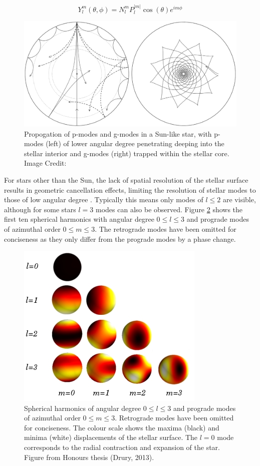 \begin{equation}
    Y^m_l (\theta,\phi) =N^m_lP^{|m|}_l\cos(\theta)e^{im\phi}
    \label{eqtn:spherical_harmonics}
\end{equation}

\begin{figure}
    \centering
    \includegraphics[width=\linewidth]{Chapter1/modes.eps}
    \caption[Propagation of p-modes and g-modes in a solar-like star]{Propogation of p-modes and g-modes in a Sun-like star, with p-modes (left) of lower angular degree penetrating deeping into the stellar interior and g-modes (right) trapped within the stellar core. Image Credit: \cite{aerts_asteroseismology_2010}}
    \label{fig:modes}
\end{figure}

For stars other than the Sun, the lack of spatial resolution of the stellar surface results in geometric cancellation effects, limiting the resolution of stellar modes to those of low angular degree \citep{aerts_asteroseismology_2010}. Typically this means only modes of $l \leq 2$ are visible, although for some stars $l = 3$ modes can also be observed. Figure \ref{fig:spherical_harmonics} shows the first ten spherical harmonics with angular degree $0 \leq l \leq 3$ and prograde modes of azimuthal order $0 \leq m \leq 3$. The retrograde modes have been omitted for conciseness as they only differ from the prograde modes by a phase change.

\begin{figure}
    \centering
    \includegraphics[width=0.45\linewidth]{Chapter1/spherical_harmonics.png}
    \caption[Spherical harmonics and prograde modes]{Spherical harmonics of angular degree $0 \leq l \leq 3$ and prograde modes of azimuthal order $0 \leq m \leq 3$. Retrograde modes have been omitted for conciseness. The colour scale shows the maxima (black) and minima (white) displacements of the stellar surface. The $l = 0$ mode corresponds to the radial contraction and expansion of the star. Figure from Honours thesis (Drury, 2013).}
    \label{fig:spherical_harmonics}
\end{figure}

